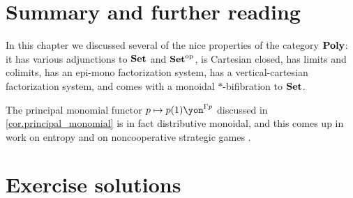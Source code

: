 \documentclass[Book-Poly]{subfiles}
\begin{document}
\section{Summary and further reading}

In this chapter we discussed several of the nice properties of the category $\mathbf{Poly}$: it has various adjunctions to $\mathbf{Set}$ and $\mathbf{Set}^{\textnormal{op}}$, is Cartesian closed, has limits and colimits, has an epi-mono factorization system, has a vertical-cartesian factorization system, and comes with a monoidal $*$-bifibration to $\mathbf{Set}$.

The principal monomial functor $p\mapsto p(1)\yon^{\Gamma p}$ discussed in \cref{cor.principal_monomial} is in fact distributive monoidal, and this comes up in work on entropy \cite{spivak2022polynomial} and on noncooperative strategic games \cite{capucci2022diegetic}.



\section{Exercise solutions}
{\footnotesize
}
\end{document}
